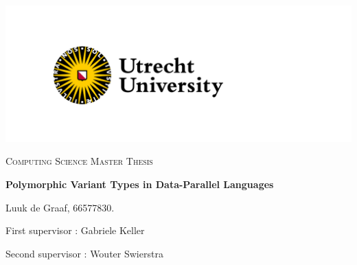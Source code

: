 \documentclass{article}
\date{\today}
\begin{document}
\begin{titlepage}

    \centering
    
    \hspace{2cm}\includegraphics[scale=1.0]{uulogo.png}

	\vspace{1cm}
	{\Large \textsc{Computing Science Master Thesis}\par}
	\vspace{1.0cm}
	{\huge\bfseries Polymorphic Variant Types in Data-Parallel Languages \par}
	\vspace{1.5cm}

    \begin{abstract}
        Data-parallelism uses the uniformity between multiple data elements to accelerate the process of operating on large collections of data.
        Variant types constrain the ability to operate uniformly, which therefore limit data-parallelism opportunities in the general case.
        In the situations where non-uniformity is inherit to the algorithm low-level optimizations are used to mitigate the heterogeneity.
        In this paper a higher abstraction level variant type is explored which can capture the required low-level control to be able to represent these optimizations in data-parallel languages.
        A polymorphic variant type is used to represent variability on the type-level, which is used by data structures to adapt to the identity of the variant type.
        Type-level programming is used to derive memory efficient representation for user-defined datatypes.
        (De)construction of variant types is automated through datatype-generic programming, which means custom memory representations can be provided seamlessly.
        It results in a fully modular variant type that can exercise low-level control while preserving the type identity of variant.
        An implementation is provided in the data-parallel language {\it Accelerate}, which demonstrates the viability of variant types in a data-parallel context.

    \end{abstract}

	\vfill

    {\Large Luuk de Graaf, 66577830. \par}

    \vspace{0.5cm}
    {\normalsize First supervisor   : Gabriele Keller \par}
    {\normalsize Second supervisor  : Wouter Swierstra \par}

\end{titlepage}
\end{document}
